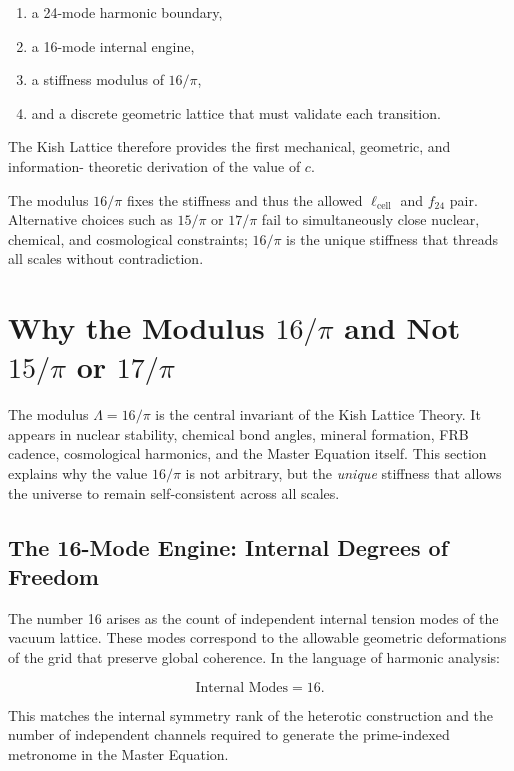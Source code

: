 \documentclass[12pt,oneside]{book}
\begin{document}
\begin{enumerate}
    \item a 24-mode harmonic boundary,
    \item a 16-mode internal engine,
    \item a stiffness modulus of \(16/\pi\),
    \item and a discrete geometric lattice that must validate each transition.
\end{enumerate}

The Kish Lattice therefore provides the first mechanical, geometric, and information-
theoretic derivation of the value of \(c\).


The modulus \(16/\pi\) fixes the stiffness and thus the allowed \(\ell_{\text{cell}}\) and
\(f_{24}\) pair. Alternative choices such as \(15/\pi\) or \(17/\pi\) fail to simultaneously
close nuclear, chemical, and cosmological constraints; \(16/\pi\) is the unique
stiffness that threads all scales without contradiction.

\section{Why the Modulus \(16/\pi\) and Not \(15/\pi\) or \(17/\pi\)}

The modulus \(\Lambda = 16/\pi\) is the central invariant of the Kish Lattice Theory.
It appears in nuclear stability, chemical bond angles, mineral formation, FRB cadence,
cosmological harmonics, and the Master Equation itself. This section explains why the
value \(16/\pi\) is not arbitrary, but the \emph{unique} stiffness that allows the universe
to remain self-consistent across all scales.

\subsection{The 16-Mode Engine: Internal Degrees of Freedom}

The number 16 arises as the count of independent internal tension modes of the vacuum
lattice. These modes correspond to the allowable geometric deformations of the grid
that preserve global coherence. In the language of harmonic analysis:



\[
\text{Internal Modes} = 16.
\]



This matches the internal symmetry rank of the heterotic construction and the number
of independent channels required to generate the prime-indexed metronome in the
Master Equation.
\end{document}
